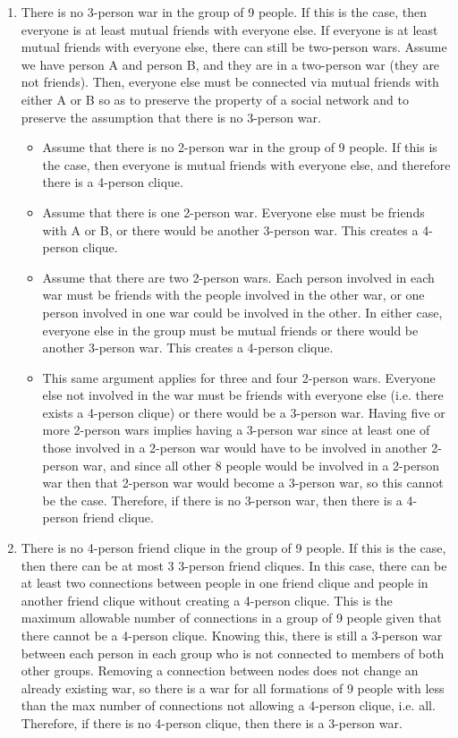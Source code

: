 \documentclass[fleqn]{article}
\begin{document}
\begin{enumerate}
	\item There is no 3-person war in the group of 9 people. If this is the case, then everyone is at least mutual friends with everyone else. If everyone is at least mutual friends with everyone else, there can still be two-person wars. Assume we have person A and person B, and they are in a two-person war (they are not friends). Then, everyone else must be connected via mutual friends with either A or B so as to preserve the property of a social network and to preserve the assumption that there is no 3-person war.
	\begin{itemize}
		\item Assume that there is no 2-person war in the group of 9 people. If this is the case, then everyone is mutual friends with everyone else, and therefore there is a 4-person clique.
		\item Assume that there is one 2-person war. Everyone else must be friends with A or B, or there would be another 3-person war. This creates a 4-person clique.
		\item Assume that there are two 2-person wars. Each person involved in each war must be friends with the people involved in the other war, or one person involved in one war could be involved in the other. In either case, everyone else in the group must be mutual friends or there would be another 3-person war. This creates a 4-person clique.
		\item This same argument applies for three and four 2-person wars. Everyone else not involved in the war must be friends with everyone else (i.e. there exists a 4-person clique) or there would be a 3-person war. Having five or more 2-person wars implies having a 3-person war since at least one of those involved in a 2-person war would have to be involved in another 2-person war, and since all other 8 people would be involved in a 2-person war then that 2-person war would become a 3-person war, so this cannot be the case. Therefore, if there is no 3-person war, then there is a 4-person friend clique.
	\end{itemize}
	\item There is no 4-person friend clique in the group of 9 people. If this is the case, then there can be at most 3 3-person friend cliques. In this case, there can be at least two connections between people in one friend clique and people in another friend clique without creating a 4-person clique. This is the maximum allowable number of connections in a group of 9 people given that there cannot be a 4-person clique. Knowing this, there is still a 3-person war between each person in each group who is not connected to members of both other groups. Removing a connection between nodes does not change an already existing war, so there is a war for all formations of 9 people with less than the max number of connections not allowing a 4-person clique, i.e. all. Therefore, if there is no 4-person clique, then there is a 3-person war.
\end{enumerate}
\end{document}
